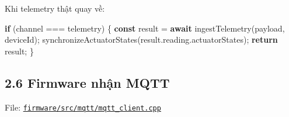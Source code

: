 \documentclass[11pt,oneside,openany]{book}
\newenvironment{Shaded}{\begin{snugshade}}{\end{snugshade}}
\newcommand{\AttributeTok}[1]{\textcolor[rgb]{0.16,0.50,0.73}{#1}}
\newcommand{\ControlFlowTok}[1]{\textcolor[rgb]{0.99,0.74,0.29}{\textbf{#1}}}
\newcommand{\FunctionTok}[1]{\textcolor[rgb]{0.56,0.27,0.68}{#1}}
\newcommand{\KeywordTok}[1]{\textcolor[rgb]{0.81,0.81,0.76}{\textbf{#1}}}
\newcommand{\NormalTok}[1]{\textcolor[rgb]{0.81,0.81,0.76}{#1}}
\newcommand{\OperatorTok}[1]{\textcolor[rgb]{0.81,0.81,0.76}{#1}}
\newcommand{\StringTok}[1]{\textcolor[rgb]{0.96,0.31,0.31}{#1}}
\renewenvironment{Shaded}{%
  \def\FrameCommand{\fboxsep=8pt\colorbox{shadecolor}}%
  \MakeFramed{\advance\hsize-\width\FrameRestore}%
}{\endMakeFramed}
\begin{document}
Khi telemetry thật quay về:

\begin{Shaded}
\begin{Highlighting}[]
\ControlFlowTok{if}\NormalTok{ (channel }\OperatorTok{===} \StringTok{\textquotesingle{}telemetry\textquotesingle{}}\NormalTok{) \{}
  \KeywordTok{const}\NormalTok{ result }\OperatorTok{=} \ControlFlowTok{await} \FunctionTok{ingestTelemetry}\NormalTok{(payload}\OperatorTok{,}\NormalTok{ deviceId)}\OperatorTok{;}
  \FunctionTok{synchronizeActuatorStates}\NormalTok{(result}\OperatorTok{.}\AttributeTok{reading}\OperatorTok{.}\AttributeTok{actuatorStates}\NormalTok{)}\OperatorTok{;}
  \ControlFlowTok{return}\NormalTok{ result}\OperatorTok{;}
\NormalTok{\}}
\end{Highlighting}
\end{Shaded}

\subsection{2.6 Firmware nhận MQTT}\label{26-firmware-nhux1eadn-mqtt}

File:
\href{../firmware/src/mqtt/mqtt_client.cpp}{\nolinkurl{firmware/src/mqtt/mqtt_client.cpp}}
\end{document}
